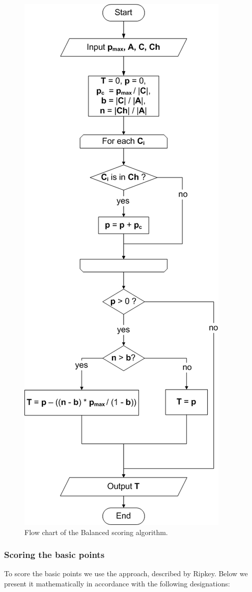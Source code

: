 \documentclass[PhD, Submit, ngerman,UKenglish,table]{scrbook}
\begin{document}
\begin{figure}[h!]
	\centering
		\includegraphics[width=.47\columnwidth]{images/algorithm.jpg}
	\caption{Flow chart of the Balanced scoring algorithm.}
	\label{fig:algorithm}
\end{figure}

\subsubsection{Scoring the basic points}

To score the basic points we use the approach, described by Ripkey. 
Below we present it mathematically in accordance with the following designations:
\end{document}
